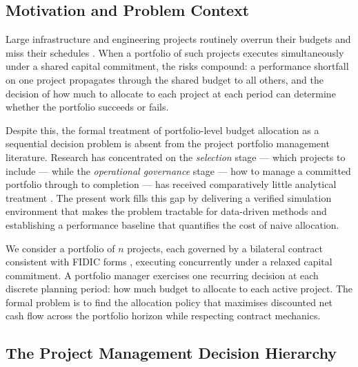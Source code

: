 
\subsection{Motivation and Problem Context}
\label{subsec:motivation}

Large infrastructure and engineering projects routinely overrun their budgets
and miss their schedules \citep{Flyvbjerg2003, Merrow2011}. When a portfolio
of such projects executes simultaneously under a shared capital commitment,
the risks compound: a performance shortfall on one project propagates through
the shared budget to all others, and the decision of how much to allocate to
each project at each period can determine whether the portfolio succeeds or fails.

Despite this, the formal treatment of portfolio-level budget allocation as a
sequential decision problem is absent from the project portfolio management
literature. Research has concentrated on the \emph{selection} stage --- which
projects to include --- while the \emph{operational governance} stage --- how
to manage a committed portfolio through to completion --- has received
comparatively little analytical treatment \citep{Archer1999, Cooper2001,
Turner2014}. The present work fills this gap by delivering a verified simulation environment
that makes the problem tractable for data-driven methods and establishing a
performance baseline that quantifies the cost of naive allocation.

We consider a portfolio of $n$ projects, each governed by a bilateral contract
consistent with FIDIC forms \citep{FIDIC2017}, executing concurrently under a
relaxed capital commitment. A portfolio manager exercises one recurring
decision at each discrete planning period: how much budget to allocate to each
active project. The formal problem is to find the allocation policy that
maximises discounted net cash flow across the portfolio horizon while
respecting contract mechanics.

\subsection{The Project Management Decision Hierarchy}
\label{subsec:hierarchy}

